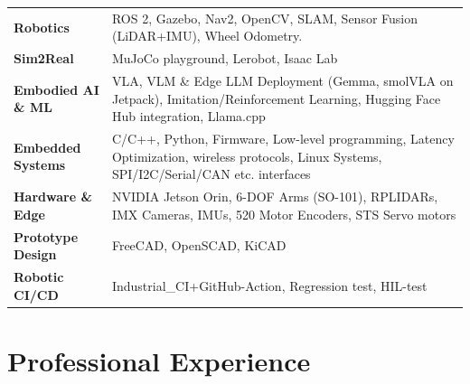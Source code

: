 \documentclass[10.5pt,letterpaper]{article}
\begin{document}
\begin{tabularx}{\linewidth}{@{}>{\bfseries}p{3.7cm}X@{}}
Robotics & ROS 2, Gazebo, Nav2, OpenCV, SLAM, Sensor Fusion (LiDAR+IMU), Wheel Odometry.
\\[2pt]
Sim2Real & MuJoCo playground, Lerobot, Isaac Lab
\\[2pt]
Embodied AI \& ML & VLA, VLM \& Edge LLM Deployment (Gemma, smolVLA on Jetpack), {Imitation/Reinforcement} Learning, Hugging Face Hub integration, Llama.cpp
\\[2pt]
Embedded Systems & C/C++, Python, Firmware, Low-level programming, Latency Optimization, wireless protocols, Linux Systems, SPI/I2C/Serial/CAN etc. interfaces
\\[2pt]
Hardware \& Edge & NVIDIA Jetson Orin, 6-DOF Arms (SO-101), RPLIDARs, IMX Cameras, IMUs, 520 Motor Encoders, STS Servo motors
\\[2pt]
Prototype Design & FreeCAD, OpenSCAD, KiCAD
\\[2pt]
Robotic CI/CD & Industrial\_CI+GitHub-Action, Regression test, HIL-test
\end{tabularx}

\section{Professional Experience}
\end{document}

